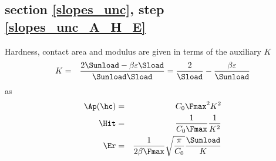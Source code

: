 \subsection{section \ref{slopes_unc}, step \ref{slopes_unc_A_H_E}}
Hardness, contact area and modulus are given in terms of the auxiliary $K$
\begin{eqnarray}
 K &=& \frac{2 \Sunload -\beta \varepsilon \Sload}{\Sunload \Sload} = \frac2{\Sload} - \frac{\beta \varepsilon }{\Sunload}
\end{eqnarray}
 as
 \begin{eqnarray}
 \Ap(\hc) &=& C_0 \Fmax^2 K ^2 \\
 \Hit &=& \frac1{C_0 \Fmax} \frac1{K^2} \\
 \Er &=& \frac1{2 \beta \Fmax}  \sqrt{\frac \pi{C_0}} \frac{\Sunload}{K}
\end{eqnarray}


